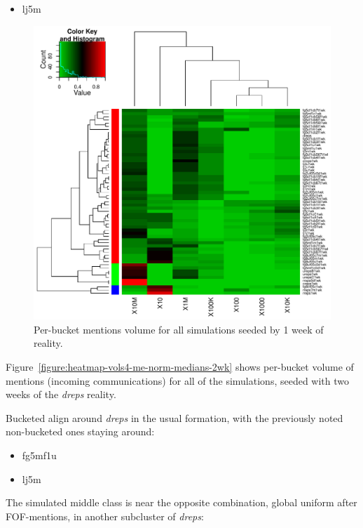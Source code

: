 \documentclass[10pt,oneside]{memoir}
\begin{document}
\begin{Spacing}{2}
\begin{itemize}
\item lj5m
\end{itemize}


\begin{figure}
\begin{center}
    \includegraphics{figures/crop/heatmap-vols4-me-norm-medians-1wk}
    \caption{Per-bucket mentions volume for all simulations seeded by 1 week of reality.}
    \label{figure:heatmap-vols4-me-norm-medians-1wk}
\end{center}
\end{figure}
Figure~\ref{figure:heatmap-vols4-me-norm-medians-2wk} shows per-bucket volume of mentions (incoming communications) for all of the simulations, seeded with two weeks of the {\itshape dreps} reality.


Bucketed align around {\itshape dreps} in the usual formation, with the previously noted non-bucketed ones staying around:


\begin{itemize}


\item fg5mf1u

\item lj5m
\end{itemize}

The simulated middle class is near the opposite combination, global uniform after FOF-mentions, in another subcluster of {\itshape dreps}:



\end{Spacing}
\end{document}
